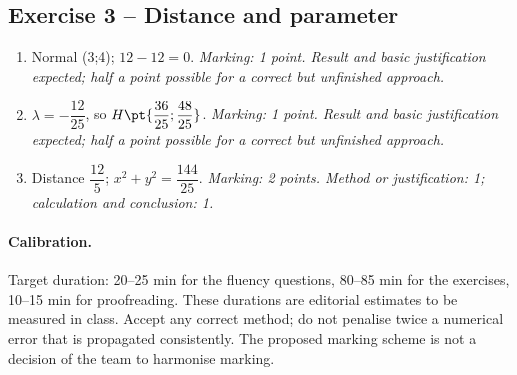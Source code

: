 \subsection*{Exercise 3 -- Distance and parameter}
\begin{enumerate}
\item Normal (3;4); $12-12=0$. \textit{Marking: 1 point. Result and basic justification expected; half a point possible for a correct but unfinished approach.}
\item $\lambda =-\dfrac{12}{25}$, so $H\pt{\dfrac{36}{25};\dfrac{48}{25}}$. \textit{Marking: 1 point. Result and basic justification expected; half a point possible for a correct but unfinished approach.}
\item Distance $\dfrac{12}{5}$; $x^2+y^2=\dfrac{144}{25}$. \textit{Marking: 2 points. Method or justification: 1; calculation and conclusion: 1.}
\end{enumerate}
\paragraph{Calibration.} Target duration: 20--25 min for the fluency questions, 80--85 min for the exercises, 10--15 min for proofreading. These durations are editorial estimates to be measured in class. Accept any correct method; do not penalise twice a numerical error that is propagated consistently. The proposed marking scheme is not a decision of the team to harmonise marking.
